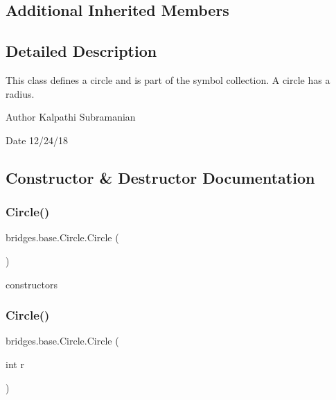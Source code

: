 \subsection*{Additional Inherited Members}


\subsection{Detailed Description}
This class defines a circle and is part of the symbol collection. A circle has a radius. 

\begin{DoxyAuthor}{Author}
Kalpathi Subramanian 
\end{DoxyAuthor}
\begin{DoxyDate}{Date}
12/24/18 
\end{DoxyDate}


\subsection{Constructor \& Destructor Documentation}
\mbox{\label{classbridges_1_1base_1_1_circle_a807231dff01120041d7d209d049e3029}} 
\subsubsection{\texorpdfstring{Circle()}{Circle()}\hspace{0.1cm}{\footnotesize\ttfamily [1/3]}}
{\footnotesize\ttfamily bridges.\+base.\+Circle.\+Circle (\begin{DoxyParamCaption}{ }\end{DoxyParamCaption})}

constructors \mbox{\label{classbridges_1_1base_1_1_circle_abfd82d0ca10193a51234657253051beb}} 
\subsubsection{\texorpdfstring{Circle()}{Circle()}\hspace{0.1cm}{\footnotesize\ttfamily [2/3]}}
{\footnotesize\ttfamily bridges.\+base.\+Circle.\+Circle (\begin{DoxyParamCaption}\item[{int}]{r }\end{DoxyParamCaption})}

